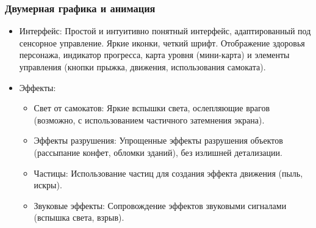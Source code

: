 \documentclass[article,12pt, fleqn]{article}
\begin{document}
\begin{itemize}
\subsubsection{Двумерная графика и анимация}
\begin{itemize}
    \item Интерфейс: Простой и интуитивно понятный интерфейс, адаптированный под сенсорное управление. Яркие иконки, четкий шрифт. Отображение здоровья персонажа, индикатор прогресса, карта уровня (мини-карта) и элементы управления (кнопки прыжка, движения, использования самоката).
    \item Эффекты:
    \begin{itemize}
        \item Свет от самокатов: Яркие вспышки света, ослепляющие врагов (возможно, с использованием частичного затемнения экрана).
        \item Эффекты разрушения: Упрощенные эффекты разрушения объектов (рассыпание конфет, обломки зданий), без излишней детализации.
        \item Частицы: Использование частиц для создания эффекта движения (пыль, искры).
        \item Звуковые эффекты: Сопровождение эффектов звуковыми сигналами (вспышка света, взрыв).
    \end{itemize}


\end{itemize}
\end{itemize}
\end{document}

